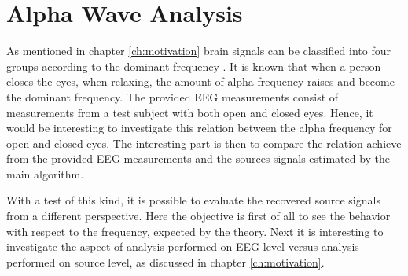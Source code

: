 \section{Alpha Wave Analysis}\label{sec:alpha_test}
As mentioned in chapter \ref{ch:motivation} brain signals can be classified into four groups according to the dominant frequency \cite{EEGsignalprocessing}. 
It is known that when a person closes the eyes, when relaxing, the amount of alpha frequency raises and become the dominant frequency. 
The provided EEG measurements consist of measurements from a test subject with both open and closed eyes.
Hence, it would be interesting to investigate this relation between the alpha frequency for open and closed eyes. 
The interesting part is then to compare the relation achieve from the provided EEG measurements and the sources signals estimated by the main algorithm.

With a test of this kind, it is possible to evaluate the recovered source signals from a different perspective. 
Here the objective is first of all to see the behavior with respect to the frequency, expected by the theory. 
Next it is interesting to investigate the aspect of analysis performed on EEG level versus analysis performed on source level, as discussed in chapter \ref{ch:motivation}.              

